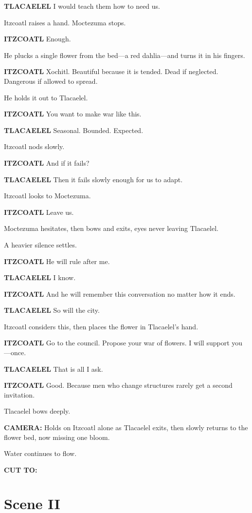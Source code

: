 \documentclass[12pt]{article}
\begin{document}
\textbf{TLACAELEL}  
I would teach them how to need us.

Itzcoatl raises a hand. Moctezuma stops.

\textbf{ITZCOATL}  
Enough.

He plucks a single flower from the bed—a red dahlia—and turns it in his fingers.

\textbf{ITZCOATL}  
Xochitl.  
Beautiful because it is tended.  
Dead if neglected.  
Dangerous if allowed to spread.

He holds it out to Tlacaelel.

\textbf{ITZCOATL}  
You want to make war like this.

\textbf{TLACAELEL}  
Seasonal.  
Bounded.  
Expected.

Itzcoatl nods slowly.

\textbf{ITZCOATL}  
And if it fails?

\textbf{TLACAELEL}  
Then it fails slowly enough for us to adapt.

Itzcoatl looks to Moctezuma.

\textbf{ITZCOATL}  
Leave us.

Moctezuma hesitates, then bows and exits, eyes never leaving Tlacaelel.

A heavier silence settles.

\textbf{ITZCOATL}  
He will rule after me.

\textbf{TLACAELEL}  
I know.

\textbf{ITZCOATL}  
And he will remember this conversation  
no matter how it ends.

\textbf{TLACAELEL}  
So will the city.

Itzcoatl considers this, then places the flower in Tlacaelel’s hand.

\textbf{ITZCOATL}  
Go to the council.  
Propose your war of flowers.  
I will support you—once.

\textbf{TLACAELEL}  
That is all I ask.

\textbf{ITZCOATL}  
Good.  
Because men who change structures  
rarely get a second invitation.

Tlacaelel bows deeply.

\textbf{CAMERA:} Holds on Itzcoatl alone as Tlacaelel exits, then slowly returns to the flower bed, now missing one bloom.

Water continues to flow.

\textbf{CUT TO:}

\section*{Scene II}
\end{document}
